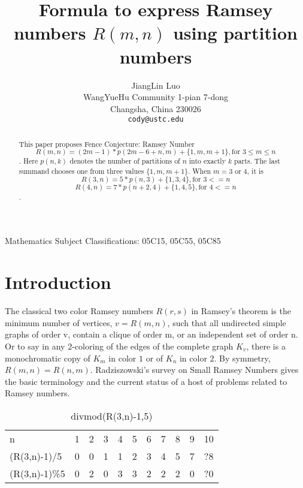 \documentclass[12pt]{article}
\begin{document}
\title{Formula to express Ramsey numbers $R(m,n)$ using partition numbers}

\author{
JiangLin Luo \\
\small WangYueHu Community 1-pian 7-dong \\[-0.8ex]
\small Changsha, China 230026 \\
\small\tt cody@ustc.edu \\
}

\maketitle

\begin{center}
\small{Mathematics Subject Classifications: 05C15, 05C55, 05C85}
\end{center}

\begin{abstract}
This paper proposes Fence Conjecture: Ramsey Number 
\[R(m,n)=(2m-1)*p(2m-6+n,m)+\{1,m,m+1\}, \text{for } 3\leq m\leq n\]. 
Here $p(n,k)$ denotes the number of partitions of $n$ into exactly $k$ parts. The last summand chooses one from three values $\{1,m,m+1\}$.
When $m=3 \text{ or }4$, it is 
\[R(3,n)=5*p(n,3)+\{1,3,4\}, \text{for } 3<=n\] 
\[R(4,n)=7*p(n+2,4)+\{1,4,5\}, \text{for } 4<=n\] .
\end{abstract}

\section{Introduction}

The classical two color Ramsey numbers $R(r, s)$ in Ramsey's theorem is the minimum number of vertices, 
$v = R(m, n)$, such that all undirected simple graphs of order v, contain a clique of order m, or an independent set of order n.
Or to say in any $2$-coloring of the edges of the complete graph $K_v$, there
is a monochromatic copy of $K_m$ in color $1$ or of $K_n$ in color $2$.
By symmetry, $R(m, n) = R(n, m)$.
Radziszowski's survey on Small Ramsey Numbers \cite{survey} gives the basic terminology and
the current status of a host of problems related to Ramsey numbers. 

\begin{table}[]
  \caption{divmod(R(3,n)-1,5)}
  \label{tab:divmodR3n1}
  \begin{tabular}{lllllllllll}
  n             & 1 & 2 & 3 & 4 & 5 & 6 & 7 & 8 & 9 & 10 \\
  (R(3,n)-1)/5  & 0 & 0 & 1 & 1 & 2 & 3 & 4 & 5 & 7 & ?8 \\
  (R(3,n)-1)\%5 & 0 & 2 & 0 & 3 & 3 & 2 & 2 & 2 & 0 & ?0
  \end{tabular}
\end{table}
\end{document}
